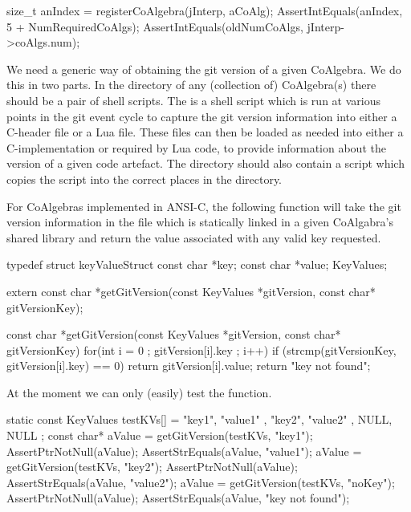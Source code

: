   size_t anIndex = registerCoAlgebra(jInterp, aCoAlg);
  AssertIntEquals(anIndex, 5 + NumRequiredCoAlgs);
  AssertIntEquals(oldNumCoAlgs, jInterp->coAlgs.num);
\stopCTest
\stopTestCase
\stopTestSuite

\startTestSuite[getGitVersion]

We need a generic way of obtaining the git version of a given CoAlgebra. 
We do this in two parts. In the  directory of any (collection 
of) CoAlgebra(s) there should be a pair of shell scripts. The 
 is a  shell script which is run at various 
points in the git event cycle to capture the git version information into 
either a C-header file or a Lua file. These files can then be loaded as 
needed into either a C-implementation or required by Lua code, to provide 
information about the version of a given code artefact. The  
directory should also contain a   script 
which copies the  script into the correct places in the 
 directory. 

For CoAlgebras implemented in ANSI-C, the following function will take the 
git version information in the  file which is 
statically linked in a given CoAlgabra's shared library and return the 
value associated with any valid key requested. 

\startCHeader
typedef struct keyValueStruct {
  const char *key;
  const char *value;
} KeyValues;

extern const char *getGitVersion(const KeyValues *gitVersion, 
                                 const char* gitVersionKey);
\stopCHeader

\startCCode
const char *getGitVersion(const KeyValues *gitVersion,
                          const char* gitVersionKey) {
  for(int i = 0 ; gitVersion[i].key ; i++) {
    if (strcmp(gitVersionKey, gitVersion[i].key) == 0) {
      return gitVersion[i].value;
    }
  }
  return "key not found";
}
\stopCCode

At the moment we can only (easily) test the  function.

\startCTest
  static const KeyValues testKVs[] = {
    { "key1", "value1" },
    { "key2", "value2" },
    { NULL,   NULL }
  };
  const char* aValue = getGitVersion(testKVs, "key1");
  AssertPtrNotNull(aValue);
  AssertStrEquals(aValue, "value1");
  aValue = getGitVersion(testKVs, "key2");
  AssertPtrNotNull(aValue);
  AssertStrEquals(aValue, "value2");
  aValue = getGitVersion(testKVs, "noKey");
  AssertPtrNotNull(aValue);
  AssertStrEquals(aValue, "key not found");
\stopCTest
\stopTestCase
\stopTestSuite

